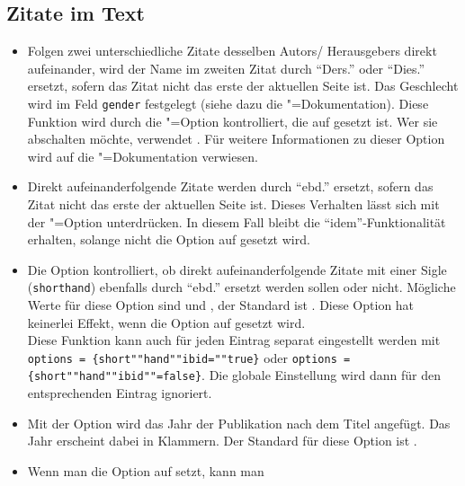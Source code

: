\documentclass[ngerman]{scrartcl}
\begin{document}
\subsection{Zitate im Text}
\begin{itemize}
	\item Folgen zwei unterschiedliche Zitate desselben Autors\slash
	      Heraus\-gebers direkt aufeinander, wird der Name im zweiten Zitat durch
	      \enquote{Ders.} oder \enquote{Dies.} ersetzt, sofern das Zitat nicht
	      das erste der aktuellen Seite ist. Das Geschlecht wird im Feld
	      \texttt{gender} festgelegt (siehe dazu die \bl"=Dokumentation).
	      Diese Funktion wird durch die \bl"=Option 
	      kontrolliert, die auf  gesetzt ist. Wer sie abschalten
	      möchte, verwendet . Für weitere Informationen
	      zu dieser Option wird auf die \bl"=Dokumentation verwiesen.
	\item Direkt aufeinanderfolgende Zitate werden durch \enquote{ebd.} ersetzt,
	      sofern das Zitat nicht das erste der aktuellen Seite ist. 
        Dieses Verhalten lässt sich mit der \bl{}"=Option  
        unterdrücken. In diesem Fall bleibt die \enquote{idem}-Funktionalität
	      erhalten, solange nicht die Option  auf 
	      gesetzt wird.
	\item Die
	      Option  kontrolliert, ob direkt 
	      aufeinanderfolgende Zitate mit einer Sigle (\texttt{shorthand})
	      ebenfalls durch \enquote{ebd.} ersetzt werden sollen oder nicht.
	      Mögliche Werte für diese Option sind  und , 
	      der Standard ist . Diese Option hat keinerlei Effekt,
	      wenn die Option  auf  gesetzt wird.\\
	      Diese Funktion kann auch für jeden Eintrag separat eingestellt werden
	      mit \texttt{options\,=\,\{short""hand""ibid=""true\}} oder 
	      \texttt{options\,=\,\{short""hand""ibid""=false\}}. Die globale
	      Einstellung wird dann für den entsprechenden Eintrag ignoriert.	      
  \item Mit der Option  wird das Jahr
  			der Publikation nach dem Titel angefügt. Das Jahr erscheint dabei in
			  Klammern. Der Standard für diese Option ist .
	\item Wenn
	      man die Option  auf  setzt, kann man 

\end{itemize}
\end{document}
